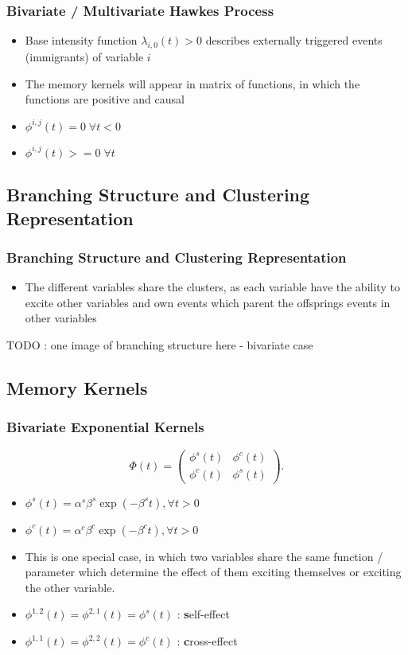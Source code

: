\documentclass{beamer}
\begin{document}
\begin{frame}
\frametitle{Bivariate / Multivariate Hawkes Process}
\begin{itemize}
	\item Base intensity function $\lambda_{i,0}(t)>0$ describes externally triggered events (immigrants) of variable $i$
	\item The memory kernels will appear in matrix of functions, in which the functions are positive and causal
	\item $\phi^{i,j}(t) = 0 \; \forall t < 0$
	\item $\phi^{i,j}(t) >= 0 \; \forall t$
\end{itemize}
\end{frame}

\subsection{Branching Structure and Clustering Representation}
\begin{frame}
\frametitle{Branching Structure and Clustering Representation}
\begin{itemize}
	\item The different variables share the clusters, as each variable have the ability to excite other variables and own events which parent the offsprings events in other variables
\end{itemize}
TODO : one image of branching structure here - bivariate case
\end{frame}

\subsection{Memory Kernels}
\begin{frame}
\frametitle{Bivariate Exponential Kernels}
\[
\Phi(t) = 
\left( \begin{array}{ccc}
\phi^s(t) & \phi^c(t) \\
\phi^c(t) & \phi^s(t) \end{array} \right).
\]
\begin{itemize}
	\item $\phi^s(t) = \alpha^s \beta^s \exp(-\beta^s t), \forall t > 0$
	\item $\phi^c(t) = \alpha^c \beta^c \exp(-\beta^c t), \forall t > 0$
	\item This is one special case, in which two variables share the same function / parameter which determine the effect of them exciting themselves or exciting the other variable.
	\item $\phi^{1,2}(t) = \phi^{2,1}(t) = \phi^s(t)$ : \textbf{s}elf-effect
	\item $\phi^{1,1}(t) = \phi^{2,2}(t) = \phi^c(t)$ : \textbf{c}ross-effect
\end{itemize}
\end{frame}
\end{document}
